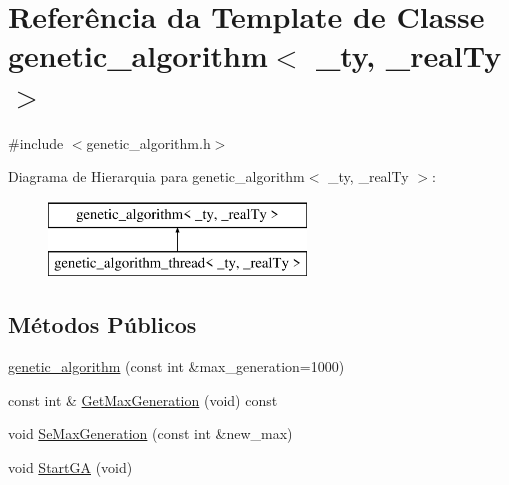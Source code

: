 \hypertarget{classgenetic__algorithm}{
\section{Referência da Template de Classe genetic\_\-algorithm$<$ \_\-ty, \_\-realTy $>$}
\label{classgenetic__algorithm}
}


{\ttfamily \#include $<$genetic\_\-algorithm.h$>$}

Diagrama de Hierarquia para genetic\_\-algorithm$<$ \_\-ty, \_\-realTy $>$:\begin{figure}[H]
\begin{center}
\leavevmode
\includegraphics[height=2cm]{classgenetic__algorithm}
\end{center}
\end{figure}
\subsection*{Métodos Públicos}
\begin{DoxyCompactItemize}
\item 
\hyperlink{classgenetic__algorithm_af33b707193eeea4557c46ddb0bde22b6}{genetic\_\-algorithm} (const int \&max\_\-generation=1000)
\item 
const int \& \hyperlink{classgenetic__algorithm_ab125057b9774303bab463defd29000e1}{GetMaxGeneration} (void) const 
\item 
void \hyperlink{classgenetic__algorithm_ad7e8c1a4ce92a617bf2d2a4496a4a31b}{SeMaxGeneration} (const int \&new\_\-max)
\item 
void \hyperlink{classgenetic__algorithm_a9a875d5695bfcc574b616f69e1605427}{StartGA} (void)
\end{DoxyCompactItemize}
